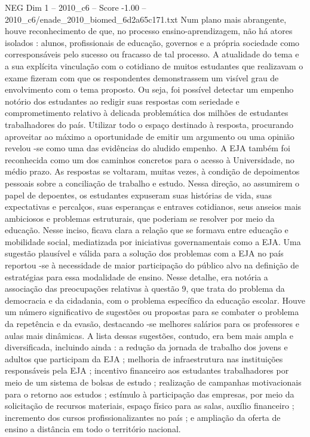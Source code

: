 \begin{textsample}{NEG Dim 1 – 2010\_c6 – Score -1.00 – 2010\_c6/enade\_2010\_biomed\_6d2a65c171.txt}
Num plano mais abrangente, houve reconhecimento de que, no processo ensino-aprendizagem, não há atores isolados : alunos, profissionais de educação, governos e a própria sociedade como corresponsáveis pelo sucesso ou fracasso de tal processo.
A atualidade do tema e a sua explícita vinculação com o cotidiano de muitos estudantes que realizavam o exame fizeram com que os respondentes demonstrassem um visível grau de envolvimento com o tema proposto.
Ou seja, foi possível detectar um empenho notório dos estudantes ao redigir suas respostas com seriedade e comprometimento relativo à delicada problemática dos milhões de estudantes trabalhadores do país.
Utilizar todo o espaço destinado à resposta, procurando aproveitar ao máximo a oportunidade de emitir um argumento ou uma opinião revelou -se como uma das evidências do aludido empenho.
A EJA também foi reconhecida como um dos caminhos concretos para o acesso à Universidade, no médio prazo.
As respostas se voltaram, muitas vezes, à condição de depoimentos pessoais sobre a conciliação de trabalho e estudo.
Nessa direção, ao assumirem o papel de depoentes, os estudantes expuseram suas histórias de vida, suas expectativas e percalços, suas esperanças e entraves cotidianos, seus anseios mais ambiciosos e problemas estruturais, que poderiam se resolver por meio da educação.
Nesse inciso, ficava clara a relação que se formava entre educação e mobilidade social, mediatizada por iniciativas governamentais como a EJA.
Uma sugestão plausível e válida para a solução dos problemas com a EJA no país reportou -se à necessidade de maior participação do público alvo na definição de estratégias para essa modalidade de ensino.
Nesse detalhe, era notória a associação das preocupações relativas à questão 9, que trata do problema da democracia e da cidadania, com o problema específico da educação escolar.
Houve um número significativo de sugestões ou propostas para se combater o problema da repetência e da evasão, destacando -se melhores salários para os professores e aulas mais dinâmicas.
A lista dessas sugestões, contudo, era bem mais ampla e diversificada, incluindo ainda : a redução da jornada de trabalho dos jovens e adultos que participam da EJA ; melhoria de infraestrutura nas instituições responsáveis pela EJA ; incentivo financeiro aos estudantes trabalhadores por meio de um sistema de bolsas de estudo ; realização de campanhas motivacionais para o retorno aos estudos ; estímulo à participação das empresas, por meio da solicitação de recursos materiais, espaço físico para as salas, auxílio financeiro ; incremento dos cursos profissionalizantes no país ; e ampliação da oferta de ensino a distância em todo o território nacional.

\end{textsample}
